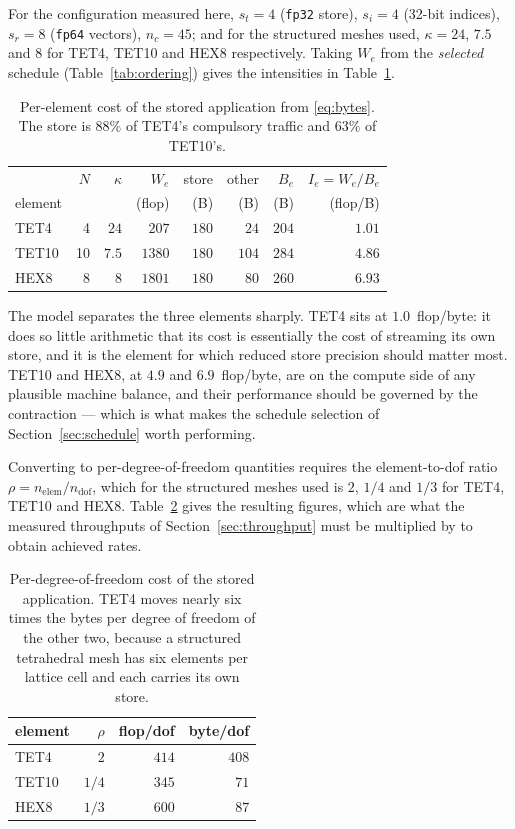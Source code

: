 \documentclass[11pt]{article}
\begin{document}
For the configuration measured here, $s_t = 4$ (\texttt{fp32} store), $s_i = 4$
(32-bit indices), $s_r = 8$ (\texttt{fp64} vectors), $n_c = 45$; and for the
structured meshes used, $\kappa = 24$, $7.5$ and $8$ for TET4, TET10 and HEX8
respectively.  Taking $W_e$ from the \emph{selected} schedule
(Table~\ref{tab:ordering}) gives the intensities in Table~\ref{tab:intensity}.

\begin{table}[ht]
\centering
\begin{tabular}{lrrrrrrr}
\toprule
        & $N$ & $\kappa$ & $W_e$ & store & other & $B_e$ & $I_e = W_e/B_e$ \\
element &     &          & (flop) & (B) & (B) & (B) & (flop/B) \\
\midrule
TET4  &  4 & $24$  &  $207$ & $180$ & $24$  & $204$ & $1.01$ \\
TET10 & 10 & $7.5$ & $1380$ & $180$ & $104$ & $284$ & $4.86$ \\
HEX8  &  8 & $8$   & $1801$ & $180$ & $80$  & $260$ & $6.93$ \\
\bottomrule
\end{tabular}
\caption{Per-element cost of the stored application from \eqref{eq:bytes}.  The
store is $88\%$ of TET4's compulsory traffic and $63\%$ of TET10's.}
\label{tab:intensity}
\end{table}

The model separates the three elements sharply.  TET4 sits at
$1.0$~flop/byte: it does so little arithmetic that its cost is essentially the
cost of streaming its own store, and it is the element for which reduced store
precision should matter most.  TET10 and HEX8, at $4.9$ and $6.9$~flop/byte,
are on the compute side of any plausible machine balance, and their performance
should be governed by the contraction --- which is what makes the schedule
selection of Section~\ref{sec:schedule} worth performing.

Converting to per-degree-of-freedom quantities requires the element-to-dof ratio
$\rho = n_{\mathrm{elem}}/n_{\mathrm{dof}}$, which for the structured meshes used
is $2$, $1/4$ and $1/3$ for TET4, TET10 and HEX8.  Table~\ref{tab:perdof} gives
the resulting figures, which are what the measured throughputs of
Section~\ref{sec:throughput} must be multiplied by to obtain achieved rates.

\begin{table}[ht]
\centering
\begin{tabular}{lrrr}
\toprule
element & $\rho$ & flop/dof & byte/dof \\
\midrule
TET4  & $2$   & $414$ & $408$ \\
TET10 & $1/4$ & $345$ & $ 71$ \\
HEX8  & $1/3$ & $600$ & $ 87$ \\
\bottomrule
\end{tabular}
\caption{Per-degree-of-freedom cost of the stored application.  TET4 moves
nearly six times the bytes per degree of freedom of the other two, because a
structured tetrahedral mesh has six elements per lattice cell and each carries
its own store.}
\label{tab:perdof}
\end{table}
\end{document}
